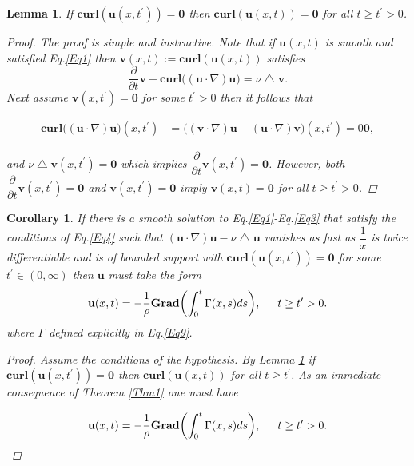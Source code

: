 \documentclass[amsmath,12pt,a4paper]{amsart}
\newtheorem{Corollary}{Corollary}
\newtheorem{lemma}{Lemma}
\begin{document}
\begin{lemma}\label{Lem1}
If $\textbf{curl}(\textbf{u}(x,t^\prime))= \textbf{0}$ then  $\textbf{curl}(\textbf{u}(x,t)) = \textbf{0}$ for all $t\ge t^\prime>0$.

\begin{proof}
The proof is simple and instructive. Note that if $\textbf{u}(x,t)$ is smooth and satisfied Eq.\eqref{Eq1} then $\textbf{v}(x,t):= \textbf{curl}(\textbf{u}(x,t))$ satisfies $$
\dfrac{\partial}{\partial t}\textbf{v} + \textbf{curl}\biggl(\left(\textbf{u}\cdot \nabla \right)\textbf{u}\biggr) = \nu \bigtriangleup\textbf{v}.
$$ Next assume $\textbf{v}(x,t^\prime)= \textbf{0}$ for some $t^\prime>0$ then it follows that

\begin{equation}\nonumber
\begin{split}
\textbf{curl}\biggl(\left(\textbf{u}\cdot \nabla \right)\textbf{u}\biggr)(x,t^\prime) & = \biggl((\textbf{v}\cdot \nabla )\textbf{u} - (\textbf{u}\cdot \nabla )\textbf{v} \biggr)(x,t^\prime)=0 \textbf{0},
\end{split}
\end{equation}

and $\nu \bigtriangleup \textbf{v} (x,t^\prime) = \textbf{0}$ which implies $\dfrac{\partial}{\partial t}\textbf{v} (x,t^\prime) = \textbf{0}$. However, both $\dfrac{\partial}{\partial t}\textbf{v} (x,t^\prime) = \textbf{0}$ and $\textbf{v}(x,t^\prime)= \textbf{0}$ imply $\textbf{v}(x,t) = \textbf{0}$ for all $t\ge t^\prime>0$. 
\end{proof}
\end{lemma}


\begin{Corollary}\label{Cor1}
If there is a smooth solution to Eq.\eqref{Eq1}-Eq.\eqref{Eq3} that satisfy the conditions of Eq.\eqref{Eq4} such that $\left(\textbf{u}\cdot \nabla \right)\textbf{u} -    \nu \bigtriangleup \textbf{u}$ vanishes as fast as $\dfrac{1}{x}$ is twice differentiable and is of bounded support with $\textbf{curl}(\textbf{u}(x,t^\prime))= \textbf{0}$ for some $t^\prime \in (0,\infty)$ then $\textbf{u}$ must take the form  $$
\textbf{u}(x,t) = -\dfrac{1}{\rho} \textbf{Grad}\biggl(\int_{0}^{t}{\Gamma(x,s) ds}\biggr), \indent t\ge t^\prime>0.
$$ where $\Gamma$ defined explicitly in Eq.\eqref{Eq9}.

\begin{proof}
Assume the conditions of the hypothesis. By Lemma \ref{Lem1} if $\textbf{curl}(\textbf{u}(x,t^\prime))= \textbf{0}$ then  $\textbf{curl}(\textbf{u}(x,t))$ for all $t\ge t^\prime$. As an immediate consequence of Theorem \ref{Thm1} one must have 

$$
\textbf{u}(x,t) = -\dfrac{1}{\rho} \textbf{Grad}\biggl(\int_{0}^{t}{\Gamma(x,s) ds}\biggr), \indent t\ge t^\prime>0.
$$ 

\end{proof} 
\end{Corollary}
\end{document}
